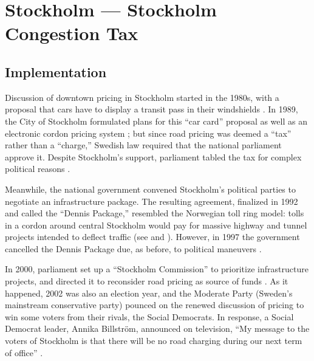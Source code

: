 \section{Stockholm --- Stockholm Congestion Tax}\label{sec:stockholm}

\subsection{Implementation}

Discussion of downtown pricing in Stockholm started in the 1980s, with a proposal that cars have to display a transit pass in their windshields \citep{GullbergIsaksson2009,Arnott2005}. In 1989, the City of Stockholm formulated plans for this ``car card'' proposal as well as an electronic cordon pricing system \citep[p. 90]{Hau1992}; but since road pricing was deemed a ``tax'' rather than a ``charge,'' Swedish law required that the national parliament approve it. Despite Stockholm's support, parliament tabled the tax for complex political reasons \citep{Ahlstrand2001}. 

Meanwhile, the national government convened Stockholm's political parties to negotiate an infrastructure package. The resulting agreement, finalized in 1992 and called the ``Dennis Package,'' resembled the Norwegian toll ring model: tolls in a cordon around central Stockholm would pay for massive highway and tunnel projects intended to deflect traffic  (see \citet[pp. 39-40]{Gomez-Ibanez1994} and \citet[p. 92]{Hau1992}). However, in 1997 the government cancelled the Dennis Package due, as before, to political maneuvers \citep{Ahlstrand2001,GullbergIsaksson2009}.

In 2000, parliament set up a ``Stockholm Commission'' to  prioritize infrastructure projects, and directed it to reconsider road pricing as source of funds \citep{Eliasson2009b}. As it happened, 2002 was also an election year, and the Moderate Party (Sweden's mainstream conservative party) pounced on the renewed discussion of pricing to win some voters from their rivals, the Social Democrats. In response, a Social Democrat leader, Annika Billstr\"om, announced on television, ``My message to the voters of Stockholm is that there will be no road charging during our next term of office'' \citep{GullbergIsaksson2009}.

